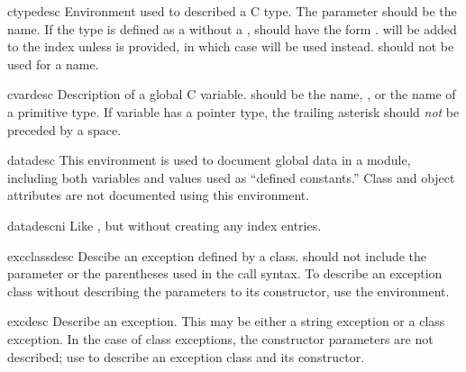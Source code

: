 \documentclass{howto}
\begin{document}
    \begin{envdesc}{ctypedesc}{}
      Environment used to described a C type.  The 
      parameter should be the  name.  If the type is
      defined as a  without a ,
       should have the form .
       will be added to the index unless  is
      provided, in which case  will be used instead.
       should not be used for a  name.
    \end{envdesc}

    \begin{envdesc}{cvardesc}{}
      Description of a global C variable.   should be the
       name, , or the name of
      a primitive type.  If variable has a pointer type, the trailing
      asterisk should \emph{not} be preceded by a space.
    \end{envdesc}

    \begin{envdesc}{datadesc}{}
      This environment is used to document global data in a module,
      including both variables and values used as ``defined
      constants.''  Class and object attributes are not documented
      using this environment.
    \end{envdesc}
    \begin{envdesc}{datadescni}{}
      Like , but without creating any index entries.
    \end{envdesc}

    \begin{envdesc}{excclassdesc}{}
      Descibe an exception defined by a class.   should not include the  parameter or
      the parentheses used in the call syntax.  To describe an
      exception class without describing the parameters to its
      constructor, use the  environment.
    \end{envdesc}

    \begin{envdesc}{excdesc}{}
      Describe an exception.  This may be either a string exception or
      a class exception.  In the case of class exceptions, the
      constructor parameters are not described; use 
      to describe an exception class and its constructor.
    \end{envdesc}
\end{document}
